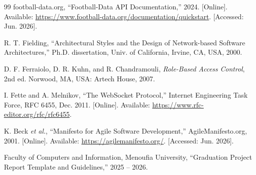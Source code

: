 \documentclass[12pt,a4paper]{report}
\newcommand{\univName}{Menoufia University}      %
\newcommand{\facultyName}{Faculty of Computers and Information}
\newcommand{\projectYear}{2025 -- 2026}          %
\begin{document}
\begin{thebibliography}{99}
football-data.org, ``Football-Data API Documentation,'' 2024. [Online].
Available: \url{https://www.football-data.org/documentation/quickstart}.
[Accessed: Jun. 2026].

R. T. Fielding, ``Architectural Styles and the Design of Network-based Software
Architectures,'' Ph.D. dissertation, Univ. of California, Irvine, CA, USA, 2000.

D. F. Ferraiolo, D. R. Kuhn, and R. Chandramouli, \textit{Role-Based Access
Control}, 2nd ed. Norwood, MA, USA: Artech House, 2007.

I. Fette and A. Melnikov, ``The WebSocket Protocol,'' Internet Engineering Task
Force, RFC 6455, Dec. 2011. [Online]. Available:
\url{https://www.rfc-editor.org/rfc/rfc6455}.

K. Beck \textit{et al.}, ``Manifesto for Agile Software Development,''
AgileManifesto.org, 2001. [Online]. Available:
\url{https://agilemanifesto.org/}. [Accessed: Jun. 2026].

\facultyName, \univName, ``Graduation Project Report Template and Guidelines,''
\projectYear.

\end{thebibliography}
\end{document}

